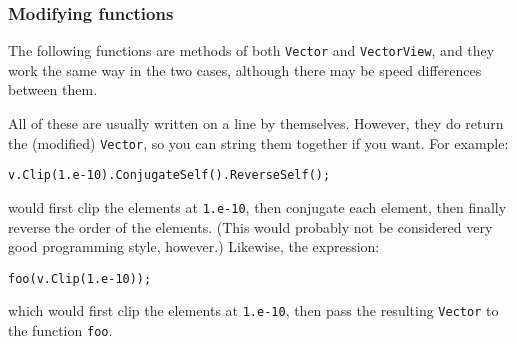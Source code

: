 \documentclass[twoside,letterpaper,11pt]{article}
\renewcommand{\tt}[1]{{\texttt {#1}}}
\begin{document}
\subsubsection{Modifying functions}

The following functions are methods of both \tt{Vector} and \tt{VectorView},
and they work the same way in the two cases, although there may be speed differences
between them.  

All of these are usually written on a line by themselves.  However, they do
return the (modified) \tt{Vector}, so you can string them together if you want.
For example:
\begin{verbatim}
v.Clip(1.e-10).ConjugateSelf().ReverseSelf();
\end{verbatim}
would first clip the elements at \tt{1.e-10}, then conjugate each element, then finally reverse the
order of the elements.  (This would probably not be considered 
very good programming style, however.)
Likewise, the expression:
\begin{verbatim}
foo(v.Clip(1.e-10));
\end{verbatim}
which would first clip the elements at \tt{1.e-10},
then pass the resulting \tt{Vector} to the function \tt{foo}.  
\end{document}

